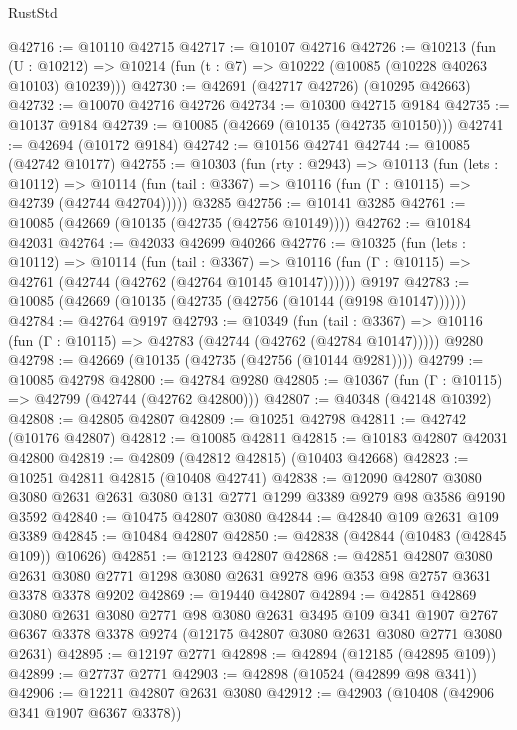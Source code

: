 \begin{lexlean}{RustStd}
\begin{coremodule}
@42716 := @10110 @42715
@42717 := @10107 @42716
@42726 := @10213
    (fun (U : @10212) => @10214 (fun (t : @7) => @10222 (@10085 (@10228 @40263 @10103) @10239)))
@42730 := @42691 (@42717 @42726) (@10295 @42663)
@42732 := @10070 @42716 @42726
@42734 := @10300 @42715 @9184
@42735 := @10137 @9184
@42739 := @10085 (@42669 (@10135 (@42735 @10150)))
@42741 := @42694 (@10172 @9184)
@42742 := @10156 @42741
@42744 := @10085 (@42742 @10177)
@42755 := @10303
    (fun (rty : @2943) =>
    @10113
      (fun (lets : @10112) =>
      @10114 (fun (tail : @3367) => @10116 (fun (Γ : @10115) => @42739 (@42744 @42704)))))
    @3285
@42756 := @10141 @3285
@42761 := @10085 (@42669 (@10135 (@42735 (@42756 @10149))))
@42762 := @10184 @42031
@42764 := @42033 @42699 @40266
@42776 := @10325
    (fun (lets : @10112) =>
    @10114
      (fun (tail : @3367) =>
      @10116 (fun (Γ : @10115) => @42761 (@42744 (@42762 (@42764 @10145 @10147))))))
    @9197
@42783 := @10085 (@42669 (@10135 (@42735 (@42756 (@10144 (@9198 @10147))))))
@42784 := @42764 @9197
@42793 := @10349
    (fun (tail : @3367) => @10116 (fun (Γ : @10115) => @42783 (@42744 (@42762 (@42784 @10147)))))
    @9280
@42798 := @42669 (@10135 (@42735 (@42756 (@10144 @9281))))
@42799 := @10085 @42798
@42800 := @42784 @9280
@42805 := @10367 (fun (Γ : @10115) => @42799 (@42744 (@42762 @42800)))
@42807 := @40348 (@42148 @10392)
@42808 := @42805 @42807
@42809 := @10251 @42798
@42811 := @42742 (@10176 @42807)
@42812 := @10085 @42811
@42815 := @10183 @42807 @42031 @42800
@42819 := @42809 (@42812 @42815) (@10403 @42668)
@42823 := @10251 @42811 @42815 (@10408 @42741)
@42838 := @12090
    @42807
    @3080
    @3080
    @2631
    @2631
    @3080
    @131
    @2771
    @1299
    @3389
    @9279
    @98
    @3586
    @9190
    @3592
@42840 := @10475 @42807 @3080
@42844 := @42840 @109 @2631 @109 @3389
@42845 := @10484 @42807
@42850 := @42838 (@42844 (@10483 (@42845 @109)) @10626)
@42851 := @12123 @42807
@42868 := @42851
    @42807
    @3080
    @2631
    @3080
    @2771
    @1298
    @3080
    @2631
    @9278
    @96
    @353
    @98
    @2757
    @3631
    @3378
    @3378
    @9202
@42869 := @19440 @42807
@42894 := @42851
    @42869
    @3080
    @2631
    @3080
    @2771
    @98
    @3080
    @2631
    @3495
    @109
    @341
    @1907
    @2767
    @6367
    @3378
    @3378
    @9274
    (@12175 @42807 @3080 @2631 @3080 @2771 @3080 @2631)
@42895 := @12197 @2771
@42898 := @42894 (@12185 (@42895 @109))
@42899 := @27737 @2771
@42903 := @42898 (@10524 (@42899 @98 @341))
@42906 := @12211 @42807 @2631 @3080
@42912 := @42903 (@10408 (@42906 @341 @1907 @6367 @3378))

\end{coremodule}
\end{lexlean}

